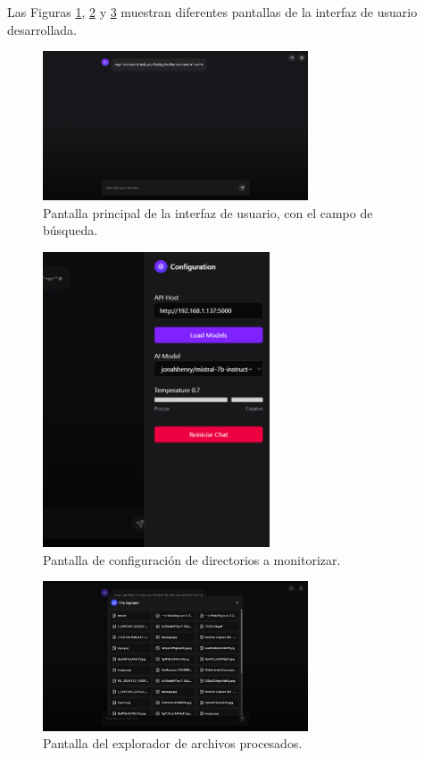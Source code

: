 Las Figuras \ref{fig:front_home}, \ref{fig:front_config} y \ref{fig:front_explorer} muestran diferentes pantallas de la interfaz de usuario desarrollada.

\begin{figure}[!htbp]
    \centering
    \includegraphics[width=0.7\textwidth]{archivos/front_home.png}
    \caption{Pantalla principal de la interfaz de usuario, con el campo de búsqueda.}
    \label{fig:front_home}
\end{figure}

\begin{figure}[!htbp]
    \centering
    \includegraphics[width=0.6\textwidth]{archivos/front_config.png}
    \caption{Pantalla de configuración de directorios a monitorizar.}
    \label{fig:front_config}
\end{figure}

\begin{figure}[!htbp]
    \centering
    \includegraphics[width=0.7\textwidth]{archivos/front_explorer.png}
    \caption{Pantalla del explorador de archivos procesados.}
    \label{fig:front_explorer}
\end{figure}

